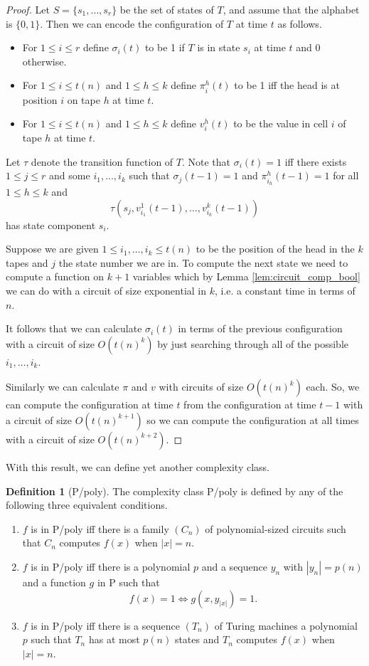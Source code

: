 \documentclass{report}
\theoremstyle{definition}
\theoremstyle{plain}
\theoremstyle{definition}
\newtheorem{defn}[thm]{Definition}
\begin{document}
	\begin{proof}
		Let $S=\{s_1,\ldots,s_r\}$ be the set of states of $T$, and assume that the alphabet is $\{0,1\}$. Then we can encode the configuration of $T$ at time $t$ as follows. 
		\begin{itemize}
			\item For $1\leq i \leq r$ define $\sigma_i(t)$ to be 1 if $T$ is in state $s_i$ at time $t$ and 0 otherwise.
			\item For $1\leq i\leq t(n)$ and $1\leq h \leq k$ define $\pi_i^h(t)$ to be 1 iff the head is at position $i$ on tape $h$ at time $t$.
			\item  For $1\leq i\leq t(n)$ and $1\leq h \leq k$ define $v_i^h(t)$ to be the value in cell $i$ of tape $h$ at time $t$.
		\end{itemize}
		Let $\tau$ denote the transition function of $T$. Note that $\sigma_i(t) = 1$ iff there exists $1\leq j\leq r$ and some $i_1,\ldots, i_k$ such that $\sigma_j(t-1) = 1$ and $\pi_{i_h}^h(t-1) = 1$ for all $1\leq h\leq k$ and 
		\[
			\tau(s_j, v_{i_1}^{1}(t-1), \ldots, v_{i_k}^k(t-1))
		\]
		has state component $s_i$.
		
		Suppose we are given $1\leq i_1,\ldots, i_k\leq t(n)$ to be the position of the head in the $k$ tapes and $j$ the state number we are in. To compute the next state we need to compute a function on $k+1$ variables which by Lemma \ref{lem:circuit_comp_bool} we can do with a circuit of size exponential in $k$, i.e. a constant time in terms of $n$.
		
		It follows that we can calculate $\sigma_i(t)$ in terms of the previous configuration with a circuit of size $O(t(n)^k)$ by just searching through all of the possible $i_1,\ldots,i_k$. 
		
		Similarly we can calculate $\pi$ and $v$ with circuits of size $O(t(n)^k)$ each. So, we can compute the configuration at time $t$ from the configuration at time $t-1$ with a circuit of size $O(t(n)^{k+1})$ so we can compute the configuration at all times with a circuit of size $O(t(n)^{k+2})$.
	\end{proof}
	With this result, we can define yet another complexity class.
	\begin{defn}[P/poly]
		The complexity class P/poly is defined by any of the following three equivalent conditions.
		\begin{enumerate}
			\item $f$ is in P/poly iff there is a family $(C_n)$ of polynomial-sized circuits such that $C_n$ computes $f(x)$ when $|x| = n$.
			\item $f$ is in P/poly iff there is a polynomial $p$ and a sequence $y_n$ with $|y_n| = p(n)$ and a function $g$ in P such that 
			\[
				f(x) = 1 \iff g(x,y_{|x|}) = 1.
			\]
			\item $f$ is in P/poly iff there is a sequence $(T_n)$ of Turing machines a polynomial $p$ such that $T_n$ has at most $p(n)$ states and $T_n$ computes $f(x)$ when $|x| = n$.
		\end{enumerate}
	\end{defn}
\end{document}
